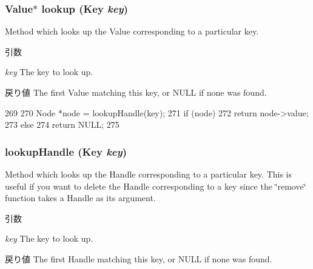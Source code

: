 \hypertarget{classTrie_acb9c4b2b263f23de8efe4c043e82ea38}{
\subsubsection[{lookup}]{\setlength{\rightskip}{0pt plus 5cm}Value$\ast$ lookup (Key {\em key})}}
\label{classTrie_acb9c4b2b263f23de8efe4c043e82ea38}
Method which looks up the Value corresponding to a particular key. 
\begin{DoxyParams}{引数}
\item[{\em key}]The key to look up. \end{DoxyParams}
\begin{DoxyReturn}{戻り値}
The first Value matching this key, or NULL if none was found. 
\end{DoxyReturn}



\begin{DoxyCode}
269     {
270         Node *node = lookupHandle(key);
271         if (node)
272             return node->value;
273         else
274             return NULL;
275     }
\end{DoxyCode}
\hypertarget{classTrie_a23b4df3a07bf7a4232b88548df7689ce}{
\subsubsection[{lookupHandle}]{ lookupHandle (Key {\em key})}}
\label{classTrie_a23b4df3a07bf7a4232b88548df7689ce}
Method which looks up the Handle corresponding to a particular key. This is useful if you want to delete the Handle corresponding to a key since the \char`\"{}remove\char`\"{} function takes a Handle as its argument. 
\begin{DoxyParams}{引数}
\item[{\em key}]The key to look up. \end{DoxyParams}
\begin{DoxyReturn}{戻り値}
The first Handle matching this key, or NULL if none was found. 
\end{DoxyReturn}



